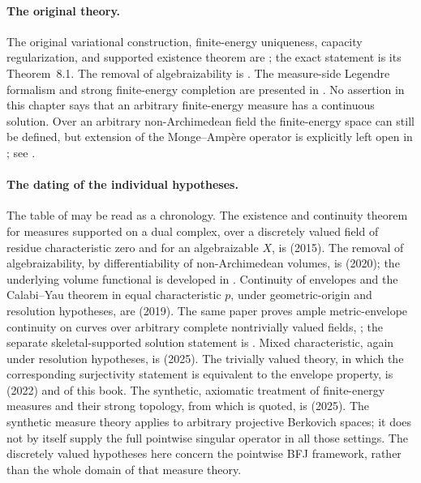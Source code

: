 \enlargethispage{2\baselineskip}

\paragraph{The original theory.}
The original variational construction, finite-energy uniqueness, capacity
regularization, and supported existence theorem are
\cite[\S\S6--8]{BFJ15}; the exact statement is its Theorem~8.1.  The
removal of algebraizability is \cite{BGGJKM20}.  The measure-side Legendre
formalism and strong finite-energy completion are presented in
\cite{BJ25FiniteEnergy}.  No assertion in this chapter says that an
arbitrary finite-energy measure has a continuous solution.
Over an arbitrary non-Archimedean field the finite-energy space can still be
defined, but extension of the Monge--Amp\`ere operator is explicitly left
open in \cite[Remark~4.4]{PS23Hybrid}; see
.

\paragraph{The dating of the individual hypotheses.}
The table of  may be read as a chronology.  The
existence and continuity theorem for measures supported on a dual complex,
over a discretely valued field of residue characteristic zero and for an
algebraizable $X$, is \cite{BFJ15} (2015).  The removal of
algebraizability, by differentiability of non-Archimedean volumes, is
\cite[Theorem~6.3.3 and Corollary~6.3.4]{BGGJKM20} (2020); the underlying
volume functional is developed in \cite{BGM21}.  Continuity of envelopes and
the Calabi--Yau theorem in equal characteristic $p$, under geometric-origin
and resolution hypotheses, are \cite[Theorems~1.4, 8.2, 9.2 and~9.3]{GJKM19}
(2019).  The same paper proves ample metric-envelope continuity on
curves over arbitrary complete nontrivially valued fields,
\cite[Theorem~1.1]{GJKM19}; the separate skeletal-supported solution
statement is .
Mixed characteristic,
again under resolution hypotheses, is \cite{FGK25} (2025).  The trivially
valued theory, in which the corresponding surjectivity statement is
equivalent to the envelope property, is \cite[\S\S7--12]{BJ22} (2022) and
 of this book.  The synthetic, axiomatic treatment of
finite-energy measures and their strong topology, from which
 is quoted, is
\cite{BJ25FiniteEnergy} (2025).  The synthetic measure theory applies to arbitrary projective Berkovich
spaces; it does not by itself supply the full pointwise singular
operator in all those settings.  The discretely valued hypotheses
here concern the pointwise BFJ framework, rather than the whole domain
of that measure theory.

